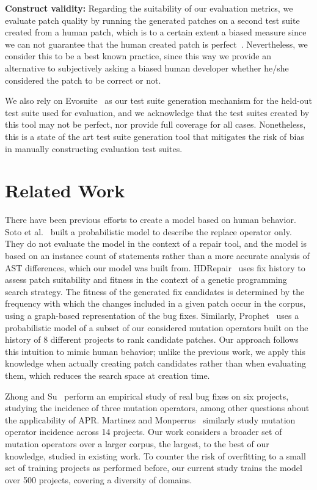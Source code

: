 \documentclass[conference]{IEEEtran}
\begin{document}
\noindent\textbf{Construct validity:}
Regarding the suitability of our evaluation metrics, we evaluate patch
quality by running the generated patches on a second test suite created
from a human patch, which is to a certain extent a biased measure since we can
not guarantee that the human created patch is perfect~\cite{smith15}. Nevertheless, we consider 
this to be a
best known practice, since this way we provide an alternative to subjectively 
asking a biased human developer
whether he/she considered the patch to be correct or not. 

We also rely on Evosuite~\cite{Fraser11Evosuite} as our test suite generation
mechanism for the held-out test suite used for evaluation, and we acknowledge
that the test suites created by this tool may not be perfect, nor provide full
coverage for all cases.  Nonetheless, this is a state of the art test suite
generation tool that mitigates the risk of bias in manually constructing
evaluation test suites.

\section{Related Work} \label{relatedWork}

There have been previous efforts to create a model based on human behavior.  
Soto et al.~\cite{Soto16} 
built a probabilistic model to describe the replace 
operator only. They do not evaluate the model in the context of a repair
tool, and the model is based on an instance count of statements rather than a more 
accurate analysis of AST differences, which our model was built from.  
HDRepair~\cite{xuan16} 
uses fix history
to assess patch suitability and fitness in the context of a genetic
programming search strategy. The fitness of the generated
fix candidates is determined by the frequency with which the changes included in
a given patch occur in the corpus, using a graph-based representation of the bug
fixes.  Similarly, Prophet~\cite{long16proph} uses a
probabilistic model of a subset of our considered mutation operators built on 
the history of 8 different projects to rank candidate
patches.  Our approach follows this intuition to mimic human
behavior; unlike the previous work, we apply this knowledge when actually
creating patch candidates rather than when evaluating them, which reduces the 
search space at creation time.  

Zhong and Su~\cite{zhong15} perform an empirical study of
real bug fixes on six projects, studying the incidence of three mutation
operators, among other questions about the applicability of APR.  Martinez and
Monperrus~\cite{martinez15} similarly study mutation operator incidence across 
14 
projects. Our work considers a broader set of
mutation operators over a larger corpus, the largest, to the best of our
knowledge, studied in existing work. To counter the 
risk of overfitting to a small set of training projects as performed before, our 
current study trains the model over 500 projects, covering a diversity 
of domains.
\end{document}
